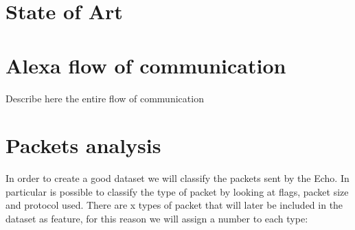 \documentclass[sigconf]{acmart}
\begin{document}
\section{State of Art}

\section{Alexa flow of communication}
Describe here the entire flow of communication

\section{Packets analysis}
In order to create a good dataset we will classify the packets sent by the Echo.
In particular is possible to classify the type of packet by looking at flags, packet size and protocol used.
There are x types of packet that will later be included in the dataset as feature, for this reason we will assign a number to each type:
\end{document}
